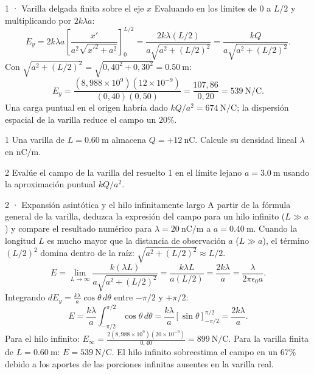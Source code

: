 \documentclass[11pt]{article}
\begin{document}
\begin{eResuelto}{1 · Varilla delgada finita sobre el eje $x$}
Evaluando en los límites de $0$ a $L/2$ y multiplicando por $2k\lambda a$:
\[ E_y = 2k\lambda a\left[\frac{x'}{a^2\sqrt{x'^2+a^2}}\right]_{0}^{L/2} = \frac{2k\lambda(L/2)}{a\sqrt{a^2+(L/2)^2}} = \frac{kQ}{a\sqrt{a^2+(L/2)^2}}. \]
Con $\sqrt{a^2+(L/2)^2}=\sqrt{0{,}40^2+0{,}30^2}=\SI{0,50}{\metre}$:
\[ E_y = \frac{(8{,}988\times10^9)(12\times10^{-9})}{(0{,}40)(0{,}50)} = \frac{107{,}86}{0{,}20} = \SI{539}{\newton\per\coulomb}. \]
Una carga puntual en el origen habría dado $kQ/a^2=\SI{674}{\newton\per\coulomb}$; la dispersión espacial de la varilla reduce el campo un $20\%$.
\end{eResuelto}

\begin{eReto}{1 }
Una varilla de $L=\SI{0,60}{\metre}$ almacena $Q=+\SI{12}{\nano\coulomb}$. Calcule su densidad lineal $\lambda$ en $\mathrm{nC/m}$.
\end{eReto}

\begin{eReto}{2 }
Evalúe el campo de la varilla del resuelto 1 en el límite lejano $a=\SI{3,0}{\metre}$ usando la aproximación puntual $kQ/a^2$.
\end{eReto}


\begin{eResuelto}{2 · Expansión asintótica y el hilo infinitamente largo}
A partir de la fórmula general de la varilla, deduzca la expresión del campo para un hilo infinito ($L\gg a$) y compare el resultado numérico para $\lambda=\SI{20}{\nano\coulomb\per\metre}$ a $a=\SI{0,40}{\metre}$.
Cuando la longitud $L$ es mucho mayor que la distancia de observación $a$ ($L\gg a$), el término $(L/2)^2$ domina dentro de la raíz: $\sqrt{a^2+(L/2)^2}\approx L/2$.
\[ E = \lim_{L\to\infty}\frac{k(\lambda L)}{a\sqrt{a^2+(L/2)^2}} = \frac{k\lambda L}{a(L/2)} = \frac{2k\lambda}{a} = \frac{\lambda}{2\pi\epsilon_0 a}. \]
Integrando $dE_y=\frac{k\lambda}{a}\cos\theta\,d\theta$ entre $-\pi/2$ y $+\pi/2$:
\[ E = \frac{k\lambda}{a}\int_{-\pi/2}^{\pi/2}\cos\theta\,d\theta = \frac{k\lambda}{a}[\sin\theta]_{-\pi/2}^{\pi/2} = \frac{2k\lambda}{a}. \]
Para el hilo infinito: $E_{\infty}=\frac{2(8{,}988\times10^9)(20\times10^{-9})}{0{,}40}=\SI{899}{\newton\per\coulomb}$.
Para la varilla finita de $L=\SI{0,60}{\metre}$: $E=\SI{539}{\newton\per\coulomb}$. El hilo infinito sobreestima el campo en un $67\%$ debido a los aportes de las porciones infinitas ausentes en la varilla real.
\end{eResuelto}
\end{document}
